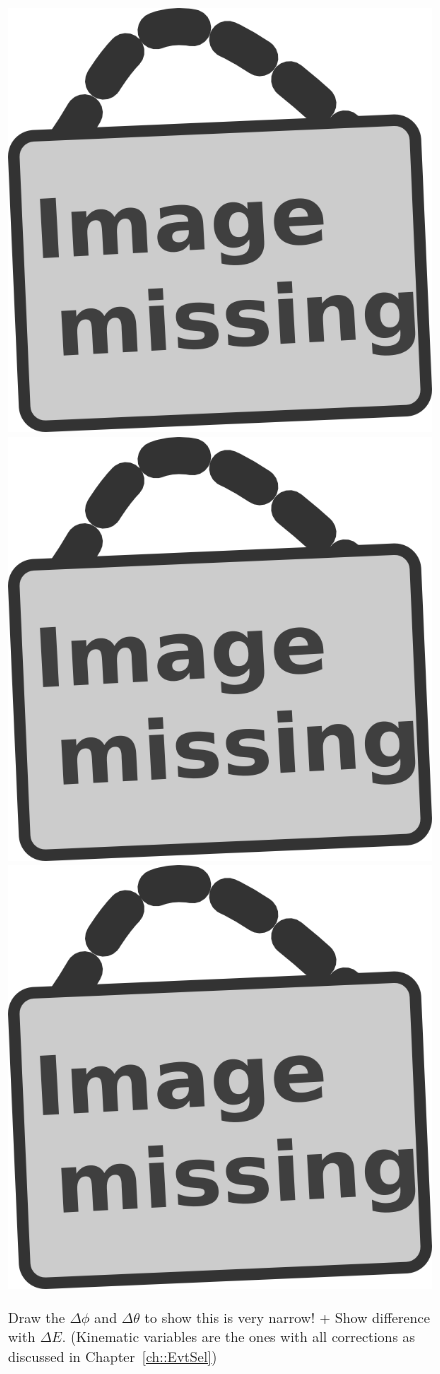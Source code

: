 \begin{figure}[h!tp]
 \centering
 \includegraphics[width = 0.31 \textwidth]{image.png} \hspace{0.1cm} 
 \includegraphics[width = 0.31 \textwidth]{image.png} \hspace{0.1cm}
 \includegraphics[width = 0.31 \textwidth]{image.png}
 \caption{Draw the $\Delta \phi$ and $\Delta \theta$ to show this is very narrow! + Show difference with $\Delta E$. (Kinematic variables are the ones with all corrections as discussed in Chapter~\ref{ch::EvtSel})} \label{fig::TFAngles}
\end{figure}

